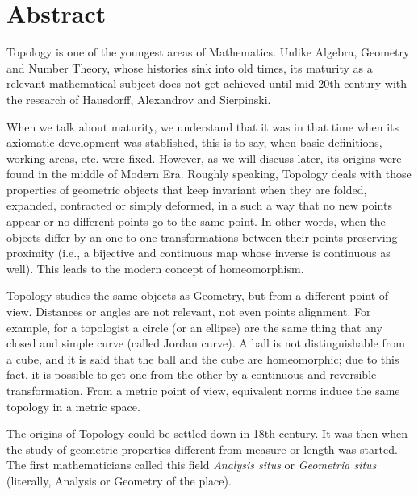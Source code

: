 \documentclass[12pt,a4paper,oldfontcommands]{memoir}
\begin{document}
\cleardoublepage
\tableofcontents*
\thispagestyle{empty}
\clearpage

\chapter*{Abstract}

Topology is one of the youngest areas of Mathematics. Unlike Algebra, Geometry and Number Theory, whose histories sink into old times, its maturity as a relevant mathematical subject does not get achieved until mid 20th century with the research  of Hausdorff, Alexandrov and Sierpinski.

When we talk about maturity, we understand that it was in that time when its axiomatic development was stablished, this is to say, when basic definitions, working areas, etc. were fixed. However, as we will discuss later,   its origins were found in the middle of Modern Era. Roughly speaking, Topology deals with those properties of geometric objects that keep invariant when they are folded, expanded, contracted or simply deformed, in a such a way that no new points  appear or no different points go to the same point. In other words, when the objects differ by an one-to-one transformations  between their points preserving proximity (i.e., a bijective and continuous map whose inverse is continuous as well). This leads  to the modern concept of homeomorphism.

Topology studies the same objects as Geometry, but from a different point of view. Distances or angles are not relevant, not even points alignment. For example, for a topologist a circle (or an ellipse) are the same thing that any closed and simple curve (called Jordan curve). A ball is not distinguishable from a cube, and it is said that the  ball and the cube are homeomorphic; due to this fact, it is possible to get one from the other by a continuous and reversible transformation. From a metric point of view, equivalent norms induce the same topology in a metric space.

The origins of Topology could be settled down in 18th century. It was then when   the study of geometric properties different from measure or length was started. The first mathematicians called this field {\em Analysis situs} or {\em Geometria situs} (literally, Analysis or Geometry of the place).
\end{document}
